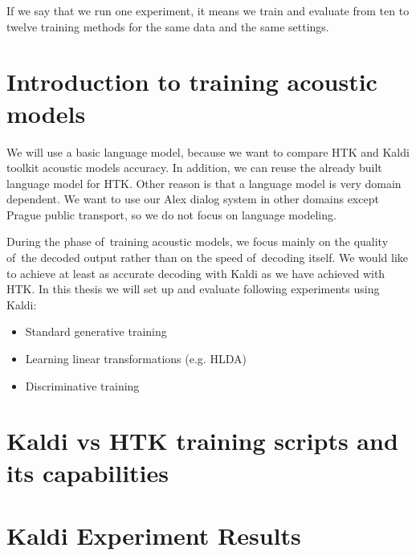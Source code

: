 If we say that we run one experiment, it means we train and evaluate from ten to twelve training methods 
for the same data and the same settings. 


\section{Introduction to training acoustic models} 
\label{sec:introduction_to_training_acoustic_models}
We will use a basic language model, because we want to compare \ac{HTK} and Kaldi 
toolkit acoustic models accuracy.  In addition, we can reuse the already built 
language model for \ac{HTK}. Other reason is that a language model is very domain 
dependent. %
We want to use our Alex dialog system in other domains except Prague public 
transport, so we do not focus on language modeling. 

During the phase of~training acoustic models, we focus mainly on the quality 
of~the decoded output rather than on the speed of~decoding itself. 
We would like to achieve at least as accurate decoding with Kaldi as we have 
achieved with \ac{HTK}. In this thesis we will set up and evaluate following 
experiments using Kaldi:
\begin{itemize}
    \item Standard generative training
    \item Learning linear transformations (e.g. \ac{HLDA})
    \item Discriminative training 
\end{itemize}


\section[Kaldi vs \ac{HTK}]{Kaldi vs \ac{HTK} training scripts and its capabilities} 
\label{sec:kaldi_htk}


\section{Kaldi Experiment Results} %
\label{sec:exp_results}

